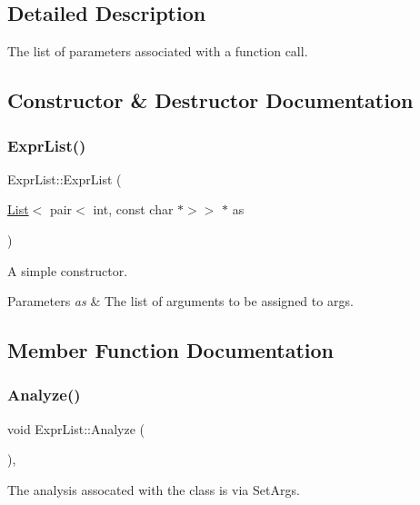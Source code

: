 \subsection{Detailed Description}
The list of parameters associated with a function call. 

\subsection{Constructor \& Destructor Documentation}
\mbox{\label{class_expr_list_ad7fa8764d55851639add773477d80a26}} 
\subsubsection{\texorpdfstring{Expr\+List()}{ExprList()}}
{\footnotesize\ttfamily Expr\+List\+::\+Expr\+List (\begin{DoxyParamCaption}\item[{\hyperlink{class_list}{List}$<$ pair$<$ int, const char $\ast$$>$$>$ $\ast$}]{as }\end{DoxyParamCaption})}

A simple constructor. 
\begin{DoxyParams}{Parameters}
{\em as} & The list of arguments to be assigned to args. \\
\hline
\end{DoxyParams}


\subsection{Member Function Documentation}
\mbox{\label{class_expr_list_ade8c035ff7457f304c32066712d55e2e}} 
\subsubsection{\texorpdfstring{Analyze()}{Analyze()}}
{\footnotesize\ttfamily void Expr\+List\+::\+Analyze (\begin{DoxyParamCaption}{ }\end{DoxyParamCaption})\hspace{0.3cm}{\ttfamily [inline]}, {\ttfamily [virtual]}}

The analysis assocated with the class is via Set\+Args. 

